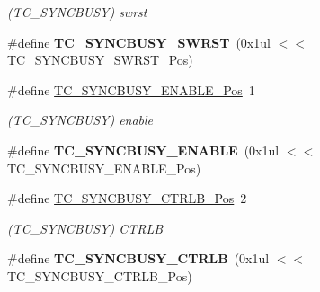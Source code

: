 \begin{DoxyCompactItemize}
\begin{DoxyCompactList}\small\item\em (T\+C\+\_\+\+S\+Y\+N\+C\+B\+U\+S\+Y) swrst \end{DoxyCompactList}\item 
\hypertarget{group___s_a_m_l21___t_c_gaf0d35e38587a8235ae3a3eb0891c7cb0}{}\#define {\bfseries T\+C\+\_\+\+S\+Y\+N\+C\+B\+U\+S\+Y\+\_\+\+S\+W\+R\+S\+T}~(0x1ul $<$$<$ T\+C\+\_\+\+S\+Y\+N\+C\+B\+U\+S\+Y\+\_\+\+S\+W\+R\+S\+T\+\_\+\+Pos)\label{group___s_a_m_l21___t_c_gaf0d35e38587a8235ae3a3eb0891c7cb0}

\item 
\hypertarget{group___s_a_m_l21___t_c_ga774bcede64e8d32a503aa5e458e71b18}{}\#define \hyperlink{group___s_a_m_l21___t_c_ga774bcede64e8d32a503aa5e458e71b18}{T\+C\+\_\+\+S\+Y\+N\+C\+B\+U\+S\+Y\+\_\+\+E\+N\+A\+B\+L\+E\+\_\+\+Pos}~1\label{group___s_a_m_l21___t_c_ga774bcede64e8d32a503aa5e458e71b18}

\begin{DoxyCompactList}\small\item\em (T\+C\+\_\+\+S\+Y\+N\+C\+B\+U\+S\+Y) enable \end{DoxyCompactList}\item 
\hypertarget{group___s_a_m_l21___t_c_gac4f6f4b3c9a16b05e79f16825314acbf}{}\#define {\bfseries T\+C\+\_\+\+S\+Y\+N\+C\+B\+U\+S\+Y\+\_\+\+E\+N\+A\+B\+L\+E}~(0x1ul $<$$<$ T\+C\+\_\+\+S\+Y\+N\+C\+B\+U\+S\+Y\+\_\+\+E\+N\+A\+B\+L\+E\+\_\+\+Pos)\label{group___s_a_m_l21___t_c_gac4f6f4b3c9a16b05e79f16825314acbf}

\item 
\hypertarget{group___s_a_m_l21___t_c_ga9dc6502e6220a6c22bc2c621543a299c}{}\#define \hyperlink{group___s_a_m_l21___t_c_ga9dc6502e6220a6c22bc2c621543a299c}{T\+C\+\_\+\+S\+Y\+N\+C\+B\+U\+S\+Y\+\_\+\+C\+T\+R\+L\+B\+\_\+\+Pos}~2\label{group___s_a_m_l21___t_c_ga9dc6502e6220a6c22bc2c621543a299c}

\begin{DoxyCompactList}\small\item\em (T\+C\+\_\+\+S\+Y\+N\+C\+B\+U\+S\+Y) C\+T\+R\+L\+B \end{DoxyCompactList}\item 
\hypertarget{group___s_a_m_l21___t_c_ga5ba90c876f9d81743e43864d935331b2}{}\#define {\bfseries T\+C\+\_\+\+S\+Y\+N\+C\+B\+U\+S\+Y\+\_\+\+C\+T\+R\+L\+B}~(0x1ul $<$$<$ T\+C\+\_\+\+S\+Y\+N\+C\+B\+U\+S\+Y\+\_\+\+C\+T\+R\+L\+B\+\_\+\+Pos)\label{group___s_a_m_l21___t_c_ga5ba90c876f9d81743e43864d935331b2}


\end{DoxyCompactItemize}
